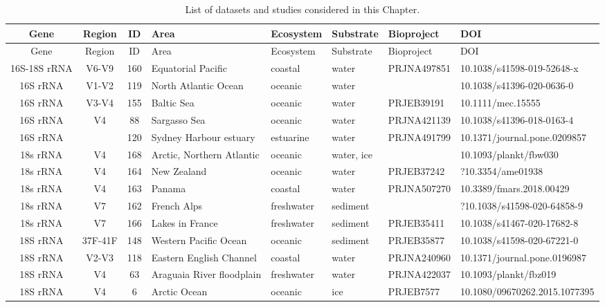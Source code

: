 \begin{longtable}{ccclllll}
\caption{List of datasets and studies considered in this Chapter.} \\ 
  \hline
  Gene & Region & ID & Area & Ecosystem & Substrate & Bioproject & DOI \\
 \endfirsthead 
 \hline 
 Gene & Region & ID & Area & Ecosystem & Substrate & Bioproject & DOI \\
 \hline 
 \endhead 
 \hline 
 \endfoot 
  \endlastfoot 
 \hline
16S-18S rRNA & V6-V9 & 160 & Equatorial Pacific & coastal & water & PRJNA497851 & 10.1038/s41598-019-52648-x \\ 
  16S rRNA & V1-V2 & 119 & North Atlantic Ocean & oceanic & water &  & 10.1038/s41396-020-0636-0 \\ 
  16S rRNA & V3-V4 & 155 & Baltic Sea & oceanic & water & PRJEB39191 & 10.1111/mec.15555 \\ 
  16S rRNA & V4 & 88 & Sargasso Sea & oceanic & water & PRJNA421139  & 10.1038/s41396-018-0163-4 \\ 
  16S rRNA &  & 120 & Sydney Harbour estuary & estuarine & water & PRJNA491799 & 10.1371/journal.pone.0209857 \\ 
  18s rRNA & V4 & 168 & Arctic, Northern Atlantic & oceanic & water, ice &  & 10.1093/plankt/fbw030 \\ 
  18s rRNA & V4 & 164 & New Zealand & oceanic & water & PRJEB37242 & ?10.3354/ame01938 \\ 
  18s rRNA & V4 & 163 & Panama & coastal & water & PRJNA507270 & 10.3389/fmars.2018.00429 \\ 
  18s rRNA & V7 & 162 & French Alps & freshwater & sediment &  & ?10.1038/s41598-020-64858-9 \\ 
  18s rRNA & V7 & 166 & Lakes in France & freshwater & sediment & PRJEB35411 & 10.1038/s41467-020-17682-8 \\ 
  18S rRNA & 37F-41F & 148 & Western Pacific Ocean & oceanic & sediment & PRJEB35877 & 10.1038/s41598-020-67221-0 \\ 
  18S rRNA & V2-V3 & 118 & Eastern English Channel & coastal & water & PRJNA240960 & 10.1371/journal.pone.0196987 \\ 
  18S rRNA & V4 & 63 & Araguaia River floodplain & freshwater & water & PRJNA422037 & 10.1093/plankt/fbz019 \\ 
  18S rRNA & V4 & 6 & Arctic Ocean & oceanic & ice & PRJEB7577 & 10.1080/09670262.2015.1077395 \\ 

\end{longtable}
